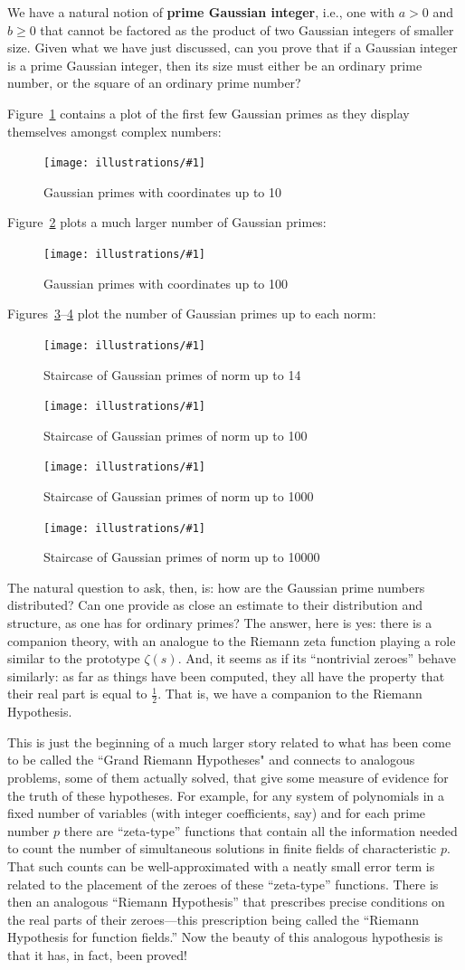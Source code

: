\documentclass[openany]{book}
\newcommand{\ill}[3]{%
   \begin{figure}[H]%
   \vspace{-2ex}
   \centering%
   \texttt{[image: illustrations/\#1]}%
   \caption{#3}%
   \vspace{-2ex}
    \end{figure}}
\theoremstyle{plain}
\theoremstyle{definition}
\begin{document}
{{ We have a natural notion of {\bf prime Gaussian integer}, i.e., one
 with $a>0$ and $b\geq 0$ that cannot be factored as the product of
 two Gaussian integers of smaller size.  Given what we have just
 discussed, can you prove that if a Gaussian integer is a prime
 Gaussian integer, then its size must either be an ordinary prime
 number, or the square of an ordinary prime number?

Figure~\ref{fig:gaussian-10} contains a plot of the first few Gaussian
primes as they display themselves amongst complex numbers:

\ill{gaussian_primes-10}{.8}{Gaussian primes with coordinates up to 10\label{fig:gaussian-10}}

Figure~\ref{fig:gaussian-100} plots a much larger number of Gaussian primes:

\ill{gaussian_primes-100}{1}{Gaussian primes with coordinates up to 100\label{fig:gaussian-100}}

  Figures~\ref{fig:gaussian-staircase-14}--\ref{fig:gaussian-staircase-10000} plot the number
  of Gaussian primes up to each norm:

\ill{gaussian_staircase_14}{.8}{Staircase of Gaussian primes of norm up to 14\label{fig:gaussian-staircase-14}}
\ill{gaussian_staircase_100}{.8}{Staircase of Gaussian primes of norm up to 100}
\ill{gaussian_staircase_1000}{.8}{Staircase of Gaussian primes of norm up to 1000}
\ill{gaussian_staircase_10000}{.8}{Staircase of Gaussian primes of norm up to 10000\label{fig:gaussian-staircase-10000}}

The natural question to ask, then, is: how are the Gaussian prime numbers distributed? Can one provide as close an estimate to their distribution and structure, as one has for ordinary primes?  The answer, here is yes: there is a companion theory,  with an analogue to the Riemann zeta function playing  a role similar to the prototype $\zeta(s)$.  And, it seems as if its ``nontrivial zeroes'' behave similarly: as far as things have been computed, they  all have the property that
their real part is equal to ${\frac{1}{2}}$.  That is, we
have a companion to the Riemann Hypothesis.

 This is just the beginning of a much larger story related to what has been come to be called  the ``Grand Riemann Hypotheses" and connects to analogous problems, some of them actually solved, that give some measure of evidence for the truth of these hypotheses.  For example, for any system
of polynomials in a fixed number of variables (with integer
coefficients, say) and for each prime number $p$ there are
``zeta-type'' functions that contain all the information needed to
count the number of simultaneous solutions in finite fields of
characteristic $p$.  That such counts can be well-approximated with a
neatly small error term is related to the placement of the zeroes of
these ``zeta-type'' functions. There is then an analogous ``Riemann Hypothesis''
that prescribes precise conditions on the real parts of their
zeroes---this prescription being called the ``Riemann Hypothesis for
function fields.'' Now the beauty of this analogous hypothesis is that
it has, in fact, been proved!

}}
\end{document}
